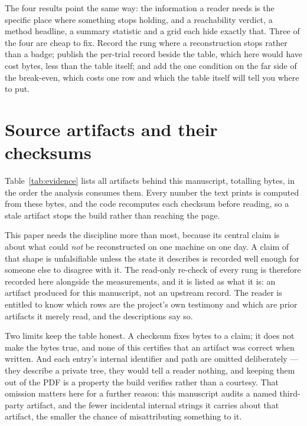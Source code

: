 The four results point the same way: the information a reader needs is the
specific place where something stops holding, and a reachability verdict, a
method headline, a summary statistic and a grid each hide exactly that. Three of
the four are cheap to fix. Record the rung where a reconstruction stops rather
than a badge; publish the per-trial record beside the table, which here would
have cost \CxBytesMinimal{} bytes, less than the table itself; and add the one
condition on the far side of the break-even, which costs one row and which the
table itself will tell you where to put.

\appendix

\section{Source artifacts and their checksums}
\label{app:evidence}

Table~\ref{tab:evidence} lists all \NEvidence{} artifacts behind this
manuscript, totalling \EvidenceBytes{} bytes, in the order the analysis consumes
them. Every number the text prints is computed from these bytes, and the code
recomputes each checksum before reading, so a stale artifact stops the build
rather than reaching the page.

This paper needs the discipline more than most, because its central claim is
about what could \emph{not} be reconstructed on one machine on one day. A claim
of that shape is unfalsifiable unless the state it describes is recorded well
enough for someone else to disagree with it. The read-only re-check of every
rung is therefore recorded here alongside the measurements, and it is listed as
what it is: an artifact produced for this manuscript, not an upstream record.
The reader is entitled to know which rows are the project's own testimony and
which are prior artifacts it merely read, and the descriptions say so.

Two limits keep the table honest. A checksum fixes bytes to a claim; it does not
make the bytes true, and none of this certifies that an artifact was correct
when written. And each entry's internal identifier and path are omitted
deliberately --- they describe a private tree, they would tell a reader nothing,
and keeping them out of the PDF is a property the build verifies rather than a
courtesy. That omission matters here for a further reason: this manuscript
audits a named third-party artifact, and the fewer incidental internal strings
it carries about that artifact, the smaller the chance of misattributing
something to it.

